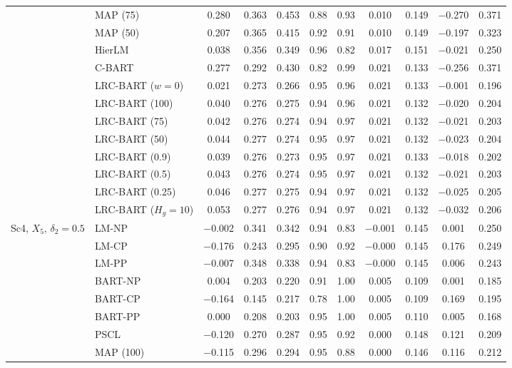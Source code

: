 \begin{center}
\begin{longtable}{llccccccccc}
& MAP (75) & 0.280 & 0.363 & 0.453 & 0.88 & 0.93 & 0.010 & 0.149 & $-$0.270 & 0.371 \\
& MAP (50) & 0.207 & 0.365 & 0.415 & 0.92 & 0.91 & 0.010 & 0.149 & $-$0.197 & 0.323 \\
& HierLM & 0.038 & 0.356 & 0.349 & 0.96 & 0.82 & 0.017 & 0.151 & $-$0.021 & 0.250 \\
& C-BART & 0.277 & 0.292 & 0.430 & 0.82 & 0.99 & 0.021 & 0.133 & $-$0.256 & 0.371 \\
& LRC-BART ($w=0$) & 0.021 & 0.273 & 0.266 & 0.95 & 0.96 & 0.021 & 0.133 & $-$0.001 & 0.196 \\
& LRC-BART (100) & 0.040 & 0.276 & 0.275 & 0.94 & 0.96 & 0.021 & 0.132 & $-$0.020 & 0.204 \\
& LRC-BART (75) & 0.042 & 0.276 & 0.274 & 0.94 & 0.97 & 0.021 & 0.132 & $-$0.021 & 0.203 \\
& LRC-BART (50) & 0.044 & 0.277 & 0.274 & 0.95 & 0.97 & 0.021 & 0.132 & $-$0.023 & 0.204 \\
& LRC-BART (0.9) & 0.039 & 0.276 & 0.273 & 0.95 & 0.97 & 0.021 & 0.133 & $-$0.018 & 0.202 \\
& LRC-BART (0.5) & 0.043 & 0.276 & 0.274 & 0.95 & 0.97 & 0.021 & 0.132 & $-$0.021 & 0.203 \\
& LRC-BART (0.25) & 0.046 & 0.277 & 0.275 & 0.94 & 0.97 & 0.021 & 0.132 & $-$0.025 & 0.205 \\
& LRC-BART ($H_g=10$) & 0.053 & 0.277 & 0.276 & 0.94 & 0.97 & 0.021 & 0.132 & $-$0.032 & 0.206 \\
\midrule
\multirow{20}{*}{Sc4, $X_5$, $\delta_2=0.5$} & LM-NP & $-$0.002 & 0.341 & 0.342 & 0.94 & 0.83 & $-$0.001 & 0.145 & 0.001 & 0.250 \\
& LM-CP & $-$0.176 & 0.243 & 0.295 & 0.90 & 0.92 & $-$0.000 & 0.145 & 0.176 & 0.249 \\
& LM-PP & $-$0.007 & 0.348 & 0.338 & 0.94 & 0.83 & $-$0.000 & 0.145 & 0.006 & 0.243 \\
& BART-NP & 0.004 & 0.203 & 0.220 & 0.91 & 1.00 & 0.005 & 0.109 & 0.001 & 0.185 \\
& BART-CP & $-$0.164 & 0.145 & 0.217 & 0.78 & 1.00 & 0.005 & 0.109 & 0.169 & 0.195 \\
& BART-PP & 0.000 & 0.208 & 0.203 & 0.95 & 1.00 & 0.005 & 0.110 & 0.005 & 0.168 \\
& PSCL & $-$0.120 & 0.270 & 0.287 & 0.95 & 0.92 & 0.000 & 0.148 & 0.121 & 0.209 \\
& MAP (100) & $-$0.115 & 0.296 & 0.294 & 0.95 & 0.88 & 0.000 & 0.146 & 0.116 & 0.212 \\

\end{longtable}
\end{center}
